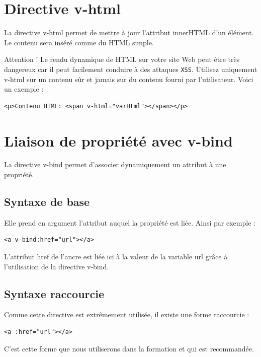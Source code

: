 \documentclass{article}
\begin{document}
\section{Directive {\color{monOrange}v-html}}
La directive {\color{monOrange}v-html} permet de mettre à jour l'attribut {\color{monOrange}innerHTML} d'un élément. Le contenu sera inséré comme du HTML simple.

Attention ! Le rendu dynamique de HTML sur votre site Web peut être très dangereux car il peut facilement conduire à des attaques {\tt XSS}. Utilisez uniquement {\color{monOrange}v-html} sur un contenu sûr et jamais sur du contenu fourni par l'utilisateur. Voici un exemple :
\begin{verbatim}
<p>Contenu HTML: <span v-html="varHtml"></span></p>
\end{verbatim}


\section{Liaison de propriété avec v-bind}
La directive v-bind permet d'associer dynamiquement un attribut à une propriété.
\subsection{Syntaxe de base}
Elle prend en argument l'attribut auquel la propriété est liée. Ainsi par exemple :
\begin{verbatim}
<a v-bind:href="url"></a>
\end{verbatim}

L'attribut href de l'ancre est liée ici à la valeur de la variable url grâce à l'utilisation de la directive v-bind.

\subsection{Syntaxe raccourcie}
Comme cette directive est extrêmement utilisée, il existe une forme raccourcie :
\begin{verbatim}
<a :href="url"></a>
\end{verbatim}
C'est cette forme que nous utiliserons dans la formation et qui est recommandée.
\end{document}
